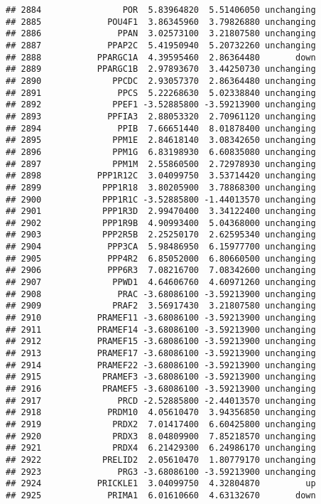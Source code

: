 \documentclass[]{article}
\begin{document}
\begin{verbatim}
## 2884                POR  5.83964820  5.51406050 unchanging
## 2885             POU4F1  3.86345960  3.79826880 unchanging
## 2886               PPAN  3.02573100  3.21807580 unchanging
## 2887             PPAP2C  5.41950940  5.20732260 unchanging
## 2888           PPARGC1A  4.39595460  2.86364480       down
## 2889           PPARGC1B  2.97893670  3.44250730 unchanging
## 2890              PPCDC  2.93057370  2.86364480 unchanging
## 2891               PPCS  5.22268630  5.02338840 unchanging
## 2892              PPEF1 -3.52885800 -3.59213900 unchanging
## 2893             PPFIA3  2.88053320  2.70961120 unchanging
## 2894               PPIB  7.66651440  8.01878400 unchanging
## 2895              PPM1E  2.84618140  3.08342650 unchanging
## 2896              PPM1G  6.83198930  6.60835080 unchanging
## 2897              PPM1M  2.55860500  2.72978930 unchanging
## 2898           PPP1R12C  3.04099750  3.53714420 unchanging
## 2899            PPP1R18  3.80205900  3.78868300 unchanging
## 2900            PPP1R1C -3.52885800 -1.44013570 unchanging
## 2901            PPP1R3D  2.99470400  3.34122400 unchanging
## 2902            PPP1R9B  4.90993400  5.04368000 unchanging
## 2903            PPP2R5B  2.25250170  2.62595340 unchanging
## 2904             PPP3CA  5.98486950  6.15977700 unchanging
## 2905             PPP4R2  6.85052000  6.80660500 unchanging
## 2906             PPP6R3  7.08216700  7.08342600 unchanging
## 2907              PPWD1  4.64606760  4.60971260 unchanging
## 2908               PRAC -3.68086100 -3.59213900 unchanging
## 2909              PRAF2  3.56917430  3.21807580 unchanging
## 2910           PRAMEF11 -3.68086100 -3.59213900 unchanging
## 2911           PRAMEF14 -3.68086100 -3.59213900 unchanging
## 2912           PRAMEF15 -3.68086100 -3.59213900 unchanging
## 2913           PRAMEF17 -3.68086100 -3.59213900 unchanging
## 2914           PRAMEF22 -3.68086100 -3.59213900 unchanging
## 2915            PRAMEF3 -3.68086100 -3.59213900 unchanging
## 2916            PRAMEF5 -3.68086100 -3.59213900 unchanging
## 2917               PRCD -2.52885800 -2.44013570 unchanging
## 2918             PRDM10  4.05610470  3.94356850 unchanging
## 2919              PRDX2  7.01417400  6.60425800 unchanging
## 2920              PRDX3  8.04809900  7.85218570 unchanging
## 2921              PRDX4  6.21429300  6.24986170 unchanging
## 2922            PRELID2  2.05610470  1.80779170 unchanging
## 2923               PRG3 -3.68086100 -3.59213900 unchanging
## 2924           PRICKLE1  3.04099750  4.32804870         up
## 2925             PRIMA1  6.01610660  4.63132670       down

\end{verbatim}
\end{document}
